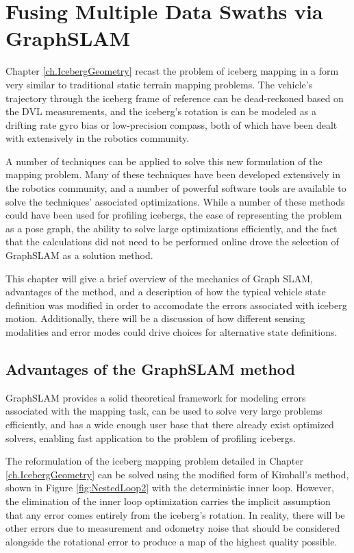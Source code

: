 
\chapter{Fusing Multiple Data Swaths via GraphSLAM}
\label{ch.GraphSLAM}

Chapter \ref{ch.IcebergGeometry} recast the problem of iceberg mapping in a form very similar to traditional static terrain mapping problems. The vehicle's trajectory through the iceberg frame of reference can be dead-reckoned based on the DVL measurements, and the iceberg's rotation is can be modeled as a drifting rate gyro bias or low-precision compass, both of which have been dealt with extensively in the robotics community.

A number of techniques can be applied to solve this new formulation of the mapping problem. Many of these techniques have been developed extensively in the robotics community, and a number of powerful software tools are available to solve the techniques' associated optimizations. While a number of these methods could have been used for profiling icebergs, the ease of representing the problem as a pose graph, the ability to solve large optimizations efficiently, and the fact that the calculations did not need to be performed online drove the selection of GraphSLAM as a solution method. 

This chapter will give a brief overview of the mechanics of Graph SLAM, advantages of the method, and a description of how the typical vehicle state definition was modified in order to accomodate the errors associated with iceberg motion. Additionally, there will be a discussion of how different sensing modalities and error modes could drive choices for alternative state definitions.

\section{Advantages of the GraphSLAM method}

GraphSLAM provides a solid theoretical framework for modeling errors associated with the mapping task, can be used to solve very large problems efficiently, and has a wide enough user base that there already exist optimized solvers, enabling fast application to the problem of profiling icebergs.

The reformulation of the iceberg mapping problem detailed in Chapter \ref{ch.IcebergGeometry} can be solved using the modified form of Kimball's method, shown in Figure \ref{fig:NestedLoop2} with the deterministic inner loop. However, the elimination of the inner loop optimization carries the implicit assumption that any error comes entirely from the iceberg's rotation. In reality, there will be other errors due to measurement and odometry noise that should be considered alongside the rotational error to produce a map of the highest quality possible. 

